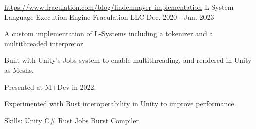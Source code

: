 \begin{cventries}
  \cventry
   {\href{https://www.fraculation.com/blog/lindenmayer-implementation}{https://www.fraculation.com/blog/lindenmayer-implementation}} %
    {L-System Language Execution Engine} %
    {Fraculation LLC} %
    {Dec. 2020 - Jun. 2023} %
    {
      \begin{cvitems} %
        \item {A custom implementation of L-Systems including a tokenizer and a multithreaded interpretor.}
        \item {Built with Unity's Jobs system to enable multithreading, and rendered in Unity as Meshs.}
        \item {Presented at M+Dev in 2022.}
        \item {Experimented with Rust interoperability in Unity to improve performance.}
        \item {Skills: Unity \textbullet{} C\# \textbullet{} Rust \textbullet{} \textbullet{} Jobs \textbullet{} Burst Compiler}
      \end{cvitems}
    }

\end{cventries}
    